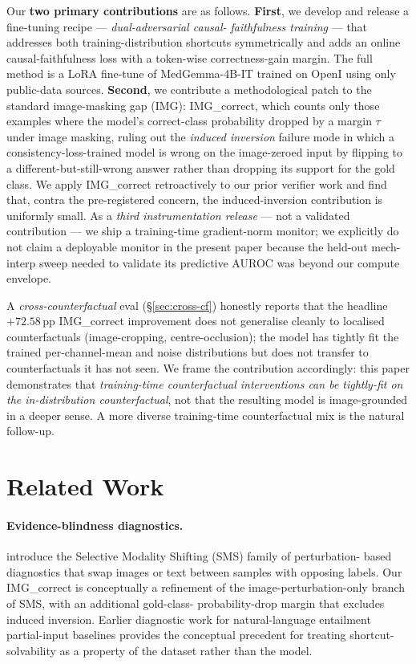 \documentclass{article}
\begin{document}
Our \textbf{two primary contributions} are as follows. \textbf{First}, we
develop and release a fine-tuning recipe --- \emph{dual-adversarial causal-
faithfulness training} --- that addresses both training-distribution
shortcuts symmetrically and adds an online causal-faithfulness loss with a
token-wise correctness-gain margin. The full method is a LoRA fine-tune of
MedGemma-4B-IT \citep{google2024medgemma} trained on OpenI
\citep{demner2016openi} using only public-data sources.
\textbf{Second}, we contribute a methodological patch to the standard
image-masking gap (IMG): IMG\_correct, which counts only those examples
where the model's correct-class probability dropped by a margin $\tau$
under image masking, ruling out the \emph{induced inversion} failure mode
in which a consistency-loss-trained model is wrong on the image-zeroed input
by flipping to a different-but-still-wrong answer rather than dropping its
support for the gold class. We apply IMG\_correct retroactively to our
prior verifier work and find that, contra the pre-registered concern, the
induced-inversion contribution is uniformly small. As a \emph{third
instrumentation release} --- not a validated contribution --- we ship a
training-time gradient-norm monitor; we explicitly do not claim a deployable
monitor in the present paper because the held-out mech-interp sweep needed
to validate its predictive AUROC was beyond our compute envelope.

A \emph{cross-counterfactual} eval (\S\ref{sec:cross-cf}) honestly reports
that the headline $+72.58$\,pp IMG\_correct improvement does not generalise
cleanly to localised counterfactuals (image-cropping, centre-occlusion);
the model has tightly fit the trained per-channel-mean and noise
distributions but does not transfer to counterfactuals it has not seen.
We frame the contribution accordingly: this paper demonstrates that
\emph{training-time counterfactual interventions can be tightly-fit on the
in-distribution counterfactual}, not that the resulting model is
image-grounded in a deeper sense. A more diverse training-time counterfactual
mix is the natural follow-up.

\section{Related Work}
\label{sec:related}

\paragraph{Evidence-blindness diagnostics.} \citet{restrepo2025sms}
introduce the Selective Modality Shifting (SMS) family of perturbation-
based diagnostics that swap images or text between samples with opposing
labels. Our IMG\_correct is conceptually a refinement of the
image-perturbation-only branch of SMS, with an additional gold-class-
probability-drop margin that excludes induced inversion. Earlier diagnostic
work for natural-language entailment partial-input baselines
\citep{gururangan2018annotation, poliak2018hypothesis} provides the
conceptual precedent for treating shortcut-solvability as a property of
the dataset rather than the model.
\end{document}
